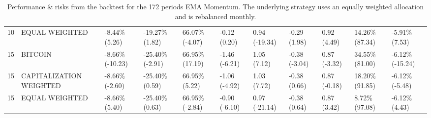 \documentclass{article}
\begin{document}
\begin{landscape}
\begin{table}[H]
\begin{tabular}{p{0.4cm}|p{3cm}|p{1.65cm}|p{1.65cm}|p{1.65cm}|p{1.65cm}|p{1.65cm}|p{1.65cm}|p{1.65cm}|p{1.65cm}|p{1.65cm}}
\\ 
10&EQUAL WEIGHTED&-8.44\% (5.26)&-19.27\% (1.82)&66.07\% (-4.07)&-0.12 (0.20)&0.94 (-19.34)&-0.29 (1.98)&0.92 (4.49)&14.26\% (87.34)&-5.91\% (7.53)
\\ 
15&BITCOIN&-8.66\% (-10.23)&-25.40\% (-2.91)&66.95\% (17.19)&-1.46 (-6.21)&1.05 (7.12)&-0.38 (-3.04)&0.87 (-3.32)&34.55\% (81.00)&-6.12\% (-15.24)
\\ 
15&CAPITALIZATION WEIGHTED&-8.66\% (-2.60)&-25.40\% (0.59)&66.95\% (5.22)&-1.06 (-4.92)&1.03 (7.72)&-0.38 (0.66)&0.87 (-0.18)&18.20\% (91.85)&-6.12\% (-5.48)
\\ 
15&EQUAL WEIGHTED&-8.66\% (5.40)&-25.40\% (0.63)&66.95\% (-2.84)&-0.90 (-6.10)&0.97 (-21.14)&-0.38 (0.64)&0.87 (3.42)&8.72\% (97.08)&-6.12\% (4.43)
\\  
    \bottomrule
  \end{tabular}
  \label{tab:emamom172equalweight}
   \caption{Performance \& risks from the backtest for the 172 periods EMA Momentum. The underlying strategy uses an equally weighted allocation and is rebalanced monthly.}
\end{table}
\end{landscape}
\end{document}
